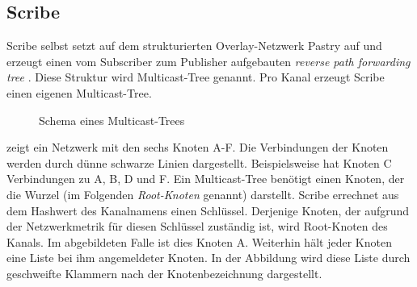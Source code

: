 \subsection{Scribe}
\label{chap:related:scribe}
Scribe \cite{Castro2002Scribe} selbst setzt auf dem strukturierten Overlay-Netzwerk Pastry \cite{Rowstron2001} auf und erzeugt einen vom Subscriber zum Publisher aufgebauten \emph{reverse path forwarding tree} \cite{Dalal1978}. Diese Struktur wird Multicast-Tree genannt. Pro Kanal erzeugt Scribe einen eigenen Multicast-Tree.

\begin{figure}[htbp]
\centering
{}
\caption{Schema eines Multicast-Trees}
\label{fig:multicast_tree}
\end{figure}

 zeigt ein Netzwerk mit den sechs Knoten A-F. Die Verbindungen der Knoten werden durch dünne schwarze Linien dargestellt. Beispielsweise hat Knoten C Verbindungen zu A, B, D und F. Ein Multicast-Tree benötigt einen Knoten, der die Wurzel (im Folgenden \emph{Root-Knoten} genannt) darstellt. Scribe errechnet aus dem Hashwert des Kanalnamens einen Schlüssel. Derjenige Knoten, der aufgrund der Netzwerkmetrik für diesen Schlüssel zuständig ist, wird Root-Knoten des Kanals. Im abgebildeten Falle ist dies Knoten A. Weiterhin hält jeder Knoten eine Liste bei ihm angemeldeter Knoten. In der Abbildung wird diese Liste durch geschweifte Klammern nach der Knotenbezeichnung dargestellt.

